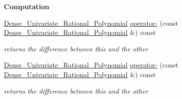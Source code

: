 \begin{Indent}\textbf{ Computation}\par
\begin{DoxyCompactItemize}
\item 
\mbox{\label{group__polygroup_a91d98d134a32b9089b6af40fc35c809f}} 
\hyperlink{group__polygroup_class_dense___univariate___rational___polynomial}{Dense\+\_\+\+Univariate\+\_\+\+Rational\+\_\+\+Polynomial} \hyperlink{group__polygroup_a91d98d134a32b9089b6af40fc35c809f}{operator-\/} (const \hyperlink{group__polygroup_class_dense___univariate___rational___polynomial}{Dense\+\_\+\+Univariate\+\_\+\+Rational\+\_\+\+Polynomial} \&) const
\begin{DoxyCompactList}\small\item\em returns the difference between {\ttfamily this} and the other \end{DoxyCompactList}\item 
\mbox{\label{group__polygroup_a91d98d134a32b9089b6af40fc35c809f}} 
\hyperlink{group__polygroup_class_dense___univariate___rational___polynomial}{Dense\+\_\+\+Univariate\+\_\+\+Rational\+\_\+\+Polynomial} \hyperlink{group__polygroup_a91d98d134a32b9089b6af40fc35c809f}{operator-\/} (const \hyperlink{group__polygroup_class_dense___univariate___rational___polynomial}{Dense\+\_\+\+Univariate\+\_\+\+Rational\+\_\+\+Polynomial} \&) const
\begin{DoxyCompactList}\small\item\em returns the difference between {\ttfamily this} and the other \end{DoxyCompactList}\end{DoxyCompactItemize}
\end{Indent}
